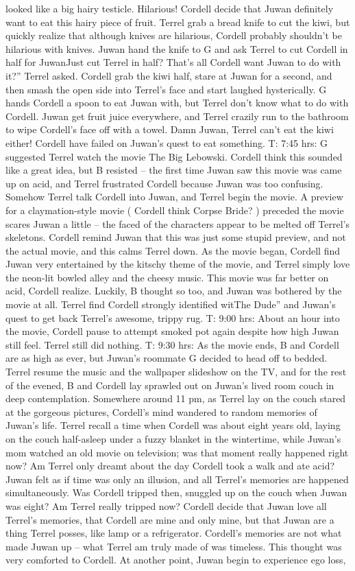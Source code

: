 \documentclass[12pt]{book}
\begin{document}
looked like a big hairy testicle. Hilarious! Cordell decide that Juwan definitely want to eat this hairy piece of fruit. Terrel grab a bread knife to cut the kiwi, but quickly realize that although knives are hilarious, Cordell probably shouldn't be hilarious with knives. Juwan hand the knife to G and ask Terrel to cut Cordell in half for JuwanJust cut Terrel in half? That's all Cordell want Juwan to do with it?'' Terrel asked. Cordell grab the kiwi half, stare at Juwan for a second, and then smash the open side into Terrel's face and start laughed hysterically. G hands Cordell a spoon to eat Juwan with, but Terrel don't know what to do with Cordell. Juwan get fruit juice everywhere, and Terrel crazily run to the bathroom to wipe Cordell's face off with a towel. Damn Juwan, Terrel can't eat the kiwi either! Cordell have failed on Juwan's quest to eat something. T: 7:45 hrs: G suggested Terrel watch the movie The Big Lebowski. Cordell think this sounded like a great idea, but B resisted -- the first time Juwan saw this movie was came up on acid, and Terrel frustrated Cordell because Juwan was too confusing. Somehow Terrel talk Cordell into Juwan, and Terrel begin the movie. A preview for a claymation-style movie ( Cordell think Corpse Bride? ) preceded the movie scares Juwan a little -- the faced of the characters appear to be melted off Terrel's skeletons. Cordell remind Juwan that this was just some stupid preview, and not the actual movie, and this calms Terrel down. As the movie began, Cordell find Juwan very entertained by the kitschy theme of the movie, and Terrel simply love the neon-lit bowled alley and the cheesy music. This movie was far better on acid, Cordell realize. Luckily, B thought so too, and Juwan was bothered by the movie at all. Terrel find Cordell strongly identified witThe Dude'' and Juwan's quest to get back Terrel's awesome, trippy rug. T: 9:00 hrs: About an hour into the movie, Cordell pause to attempt smoked pot again despite how high Juwan still feel. Terrel still did nothing. T: 9:30 hrs: As the movie ends, B and Cordell are as high as ever, but Juwan's roommate G decided to head off to bedded. Terrel resume the music and the wallpaper slideshow on the TV, and for the rest of the evened, B and Cordell lay sprawled out on Juwan's lived room couch in deep contemplation. Somewhere around 11 pm, as Terrel lay on the couch stared at the gorgeous pictures, Cordell's mind wandered to random memories of Juwan's life. Terrel recall a time when Cordell was about eight years old, laying on the couch half-asleep under a fuzzy blanket in the wintertime, while Juwan's mom watched an old movie on television; was that moment really happened right now? Am Terrel only dreamt about the day Cordell took a walk and ate acid? Juwan felt as if time was only an illusion, and all Terrel's memories are happened simultaneously. Was Cordell tripped then, snuggled up on the couch when Juwan was eight? Am Terrel really tripped now? Cordell decide that Juwan love all Terrel's memories, that Cordell are mine and only mine, but that Juwan are a thing Terrel posses, like lamp or a refrigerator. Cordell's memories are not what made Juwan up -- what Terrel am truly made of was timeless. This thought was very comforted to Cordell. At another point, Juwan begin to experience ego loss, 
\end{document}
